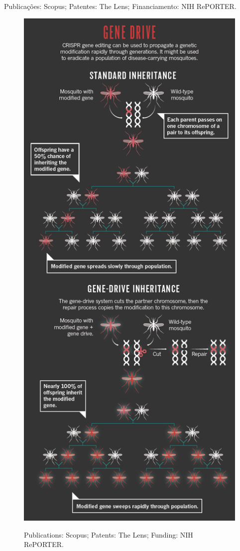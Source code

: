 \documentclass{report}
\begin{document}
Publicações: Scopus; Patentes: The Lens; Financiamento: NIH RePORTER.

\begin{figure}[h]
\center
\includegraphics[scale=0.4]{lmao}
\label{lmao}
\caption {Publications: Scopus; Patents: The Lens; Funding: NIH RePORTER.}
\end{figure}
\end{document}
